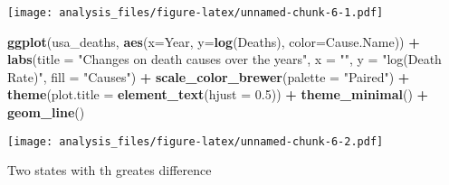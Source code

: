 \documentclass[]{article}
\newenvironment{Shaded}{\begin{snugshade}}{\end{snugshade}}
\newcommand{\DataTypeTok}[1]{\textcolor[rgb]{0.13,0.29,0.53}{#1}}
\newcommand{\FloatTok}[1]{\textcolor[rgb]{0.00,0.00,0.81}{#1}}
\newcommand{\KeywordTok}[1]{\textcolor[rgb]{0.13,0.29,0.53}{\textbf{#1}}}
\newcommand{\NormalTok}[1]{#1}
\newcommand{\OperatorTok}[1]{\textcolor[rgb]{0.81,0.36,0.00}{\textbf{#1}}}
\newcommand{\StringTok}[1]{\textcolor[rgb]{0.31,0.60,0.02}{#1}}
\begin{document}
\texttt{[image: analysis\_files/figure-latex/unnamed-chunk-6-1.pdf]}

\begin{Shaded}
\begin{Highlighting}[]
\KeywordTok{ggplot}\NormalTok{(usa_deaths, }\KeywordTok{aes}\NormalTok{(}\DataTypeTok{x=}\NormalTok{Year, }\DataTypeTok{y=}\KeywordTok{log}\NormalTok{(Deaths), }\DataTypeTok{color=}\NormalTok{Cause.Name)) }\OperatorTok{+}\StringTok{ }
\StringTok{  }\KeywordTok{labs}\NormalTok{(}\DataTypeTok{title =} \StringTok{"Changes on death causes over the years"}\NormalTok{, }\DataTypeTok{x =} \StringTok{""}\NormalTok{, }\DataTypeTok{y =} \StringTok{"log(Death Rate)"}\NormalTok{, }\DataTypeTok{fill =} \StringTok{"Causes"}\NormalTok{) }\OperatorTok{+}
\StringTok{  }\KeywordTok{scale_color_brewer}\NormalTok{(}\DataTypeTok{palette =} \StringTok{"Paired"}\NormalTok{) }\OperatorTok{+}
\StringTok{  }\KeywordTok{theme}\NormalTok{(}\DataTypeTok{plot.title =} \KeywordTok{element_text}\NormalTok{(}\DataTypeTok{hjust =} \FloatTok{0.5}\NormalTok{)) }\OperatorTok{+}
\StringTok{  }\KeywordTok{theme_minimal}\NormalTok{() }\OperatorTok{+}
\StringTok{  }\KeywordTok{geom_line}\NormalTok{() }
\end{Highlighting}
\end{Shaded}

\texttt{[image: analysis\_files/figure-latex/unnamed-chunk-6-2.pdf]}

Two states with th greates difference

\begin{Shaded}
\end{Shaded}
\end{document}
